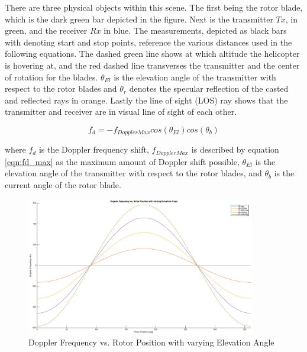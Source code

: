 There are three physical objects within this scene. The first being the rotor blade, which is the dark green bar depicted in the figure. Next is the transmitter $Tx$, in green, and the receiver $Rx$ in blue. The measurements, depicted as black bars with denoting start and stop points, reference the various distances used in the following equations. The dashed green line shows at which altitude the helicopter is hovering at, and the red dashed line transverses the transmitter and the center of rotation for the blades. $\theta_{El}$ is the elevation angle of the transmitter with respect to the rotor blades and $\theta_r$ denotes the specular reflection of the casted and reflected rays in orange. Lastly the line of sight (LOS) ray shows that the transmitter and receiver are in visual line of sight of each other.

\begin{equation}
	f_d = -f_{DopplerMax}cos(\theta_{El})cos(\theta_{b})
	\label{eq:dop_theory_blade}
\end{equation}

where $f_d$ is the Doppler frequency shift, $f_{DopplerMax}$ is described by equation \ref{eqn:fd_max} as the maximum amount of Doppler shift possible, $\theta_{El}$ is the elevation angle of the transmitter with respect to the rotor blades, and $\theta_{b}$ is the current angle of the rotor blade.

\begin{figure}
	\begin{center}
		\includegraphics[width=10cm]{images/background/2d_theoretical_doppler_profile.eps}
		\caption{Doppler Frequency vs. Rotor Position with varying Elevation Angle}
		\label{fig:2D_theoretical_doppler}
	\end{center}
\end{figure}

